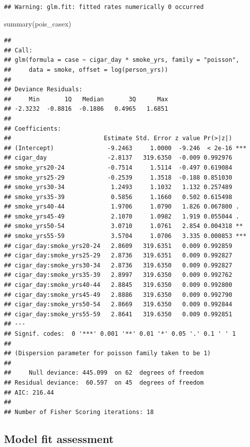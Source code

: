 \documentclass[
  10pt,
]{krantz}
\newenvironment{Shaded}{\begin{snugshade}}{\end{snugshade}}
\newcommand{\FunctionTok}[1]{\textcolor[rgb]{0.00,0.00,0.00}{#1}}
\newcommand{\NormalTok}[1]{#1}
\begin{document}
\begin{verbatim}
## Warning: glm.fit: fitted rates numerically 0 occurred
\end{verbatim}

\begin{Shaded}
\begin{Highlighting}[]
\FunctionTok{summary}\NormalTok{(pois\_casex)}
\end{Highlighting}
\end{Shaded}

\begin{verbatim}
## 
## Call:
## glm(formula = case ~ cigar_day * smoke_yrs, family = "poisson", 
##     data = smoke, offset = log(person_yrs))
## 
## Deviance Residuals: 
##     Min       1Q   Median       3Q      Max  
## -2.3232  -0.8816  -0.1886   0.4965   1.6851  
## 
## Coefficients:
##                          Estimate Std. Error z value Pr(>|z|)    
## (Intercept)               -9.2463     1.0000  -9.246  < 2e-16 ***
## cigar_day                 -2.8137   319.6350  -0.009 0.992976    
## smoke_yrs20-24            -0.7514     1.5114  -0.497 0.619084    
## smoke_yrs25-29            -0.2539     1.3518  -0.188 0.851030    
## smoke_yrs30-34             1.2493     1.1032   1.132 0.257489    
## smoke_yrs35-39             0.5856     1.1660   0.502 0.615498    
## smoke_yrs40-44             1.9706     1.0790   1.826 0.067800 .  
## smoke_yrs45-49             2.1070     1.0982   1.919 0.055044 .  
## smoke_yrs50-54             3.0710     1.0761   2.854 0.004318 ** 
## smoke_yrs55-59             3.5704     1.0706   3.335 0.000853 ***
## cigar_day:smoke_yrs20-24   2.8609   319.6351   0.009 0.992859    
## cigar_day:smoke_yrs25-29   2.8736   319.6351   0.009 0.992827    
## cigar_day:smoke_yrs30-34   2.8736   319.6350   0.009 0.992827    
## cigar_day:smoke_yrs35-39   2.8997   319.6350   0.009 0.992762    
## cigar_day:smoke_yrs40-44   2.8845   319.6350   0.009 0.992800    
## cigar_day:smoke_yrs45-49   2.8886   319.6350   0.009 0.992790    
## cigar_day:smoke_yrs50-54   2.8669   319.6350   0.009 0.992844    
## cigar_day:smoke_yrs55-59   2.8641   319.6350   0.009 0.992851    
## ---
## Signif. codes:  0 '***' 0.001 '**' 0.01 '*' 0.05 '.' 0.1 ' ' 1
## 
## (Dispersion parameter for poisson family taken to be 1)
## 
##     Null deviance: 445.099  on 62  degrees of freedom
## Residual deviance:  60.597  on 45  degrees of freedom
## AIC: 216.44
## 
## Number of Fisher Scoring iterations: 18
\end{verbatim}

\hypertarget{model-fit-assessment-3}{%
\subsection{\texorpdfstring{Model fit assessment}{Model fit assessment}}\label{model-fit-assessment-3}}
\end{document}
